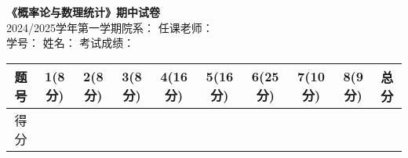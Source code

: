 \documentclass[10pt,addpoints,portrait]{exam}
\begin{document}
		\begin{center}
			\textbf{《概率论与数理统计》期中试卷} \\
			2024/2025学年第一学期\hspace{0.3cm}院系：\underline{\hspace{1in}}\hspace{0.3cm} 任课老师：\underline{\hspace{1in}} \\
			学号：\underline{\hspace{1in}}\hspace{0.3cm} 姓名：\underline{\hspace{1in}}\hspace{0.3cm} 考试成绩：\underline{\hspace{1in}}
			{	\small
				\begin{tabular}{|c|c|c|c|c|c|c|c|c|c|}
					\hline
					题号 & 1(8分) &2(8分)&3(8分) & 4(16分)& 5(16分) & 6(25分) & 7(10分) & 8(9分) & 总分 \\
					\hline
					得分 &  &  & & &  &  &  &  &  \\
					\hline
				\end{tabular}
			}
		\end{center} 
		
\end{document}
